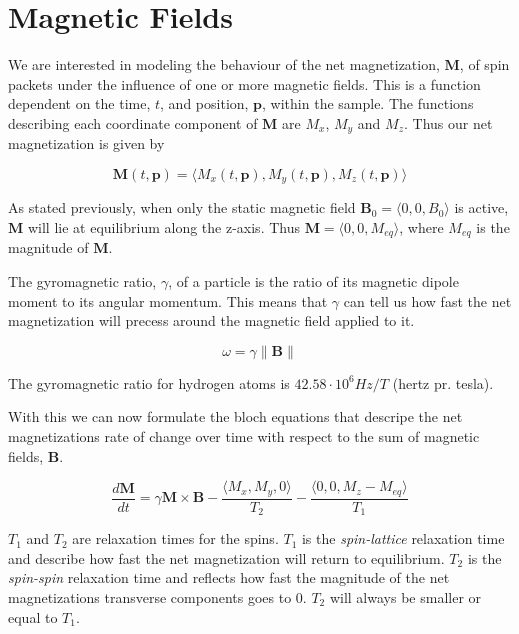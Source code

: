 \section{Magnetic Fields}


We are interested in modeling the behaviour of the net magnetization,
$\textbf{M}$, of spin packets under the influence of one or more
magnetic fields. This is a function dependent on the time, $t$, and
position, $\textbf{p}$, within the sample. The functions describing
each coordinate component of $\textbf{M}$ are $M_x$, $M_y$ and
$M_z$. Thus our net magnetization is given by

\begin{displaymath}
  \textbf{M}(t, \textbf{p}) = \langle M_x(t, \textbf{p}), M_y(t, \textbf{p}), M_z(t, \textbf{p}) \rangle
\end{displaymath}

As stated previously, when only the static magnetic field
$\mathbf{B}_0 = \langle 0, 0, B_0 \rangle$ is active, $\textbf{M}$
will lie at equilibrium along the z-axis. Thus $\textbf{M} = \langle
0, 0, M_{eq} \rangle$, where $M_{eq}$ is the magnitude of $\textbf{M}$.

The gyromagnetic ratio, $\gamma$, of a particle is the ratio of its
magnetic dipole moment to its angular momentum. This means that
$\gamma$ can tell us how fast the net magnetization will precess
around the magnetic field applied to it. 

\begin{displaymath}
  \omega = \gamma \| \mathbf{B} \|
\end{displaymath}

The gyromagnetic ratio for hydrogen atoms is $42.58 \cdot 10^6 Hz  / T$
(hertz pr. tesla).

With this we can now formulate the bloch equations that descripe the
net magnetizations rate of change over time with respect to the sum of
magnetic fields, $\mathbf{B}$.

\begin{displaymath}
  \frac{d\mathbf{M}}{dt} = \gamma \mathbf{M} \times \mathbf{B} -
  \frac{\langle M_x, M_y, 0 \rangle}{T_2} - \frac{\langle 0, 0, M_z -
    M_{eq} \rangle}{T_1}
\end{displaymath}

$T_1$ and $T_2$ are relaxation times for the spins. $T_1$ is the
\textit{spin-lattice} relaxation time and describe how fast the net
magnetization will return to equilibrium. $T_2$ is the
\textit{spin-spin} relaxation time and reflects how fast the magnitude
of the net magnetizations transverse components goes to 0. $T_2$ will
always be smaller or equal to $T_1$.

